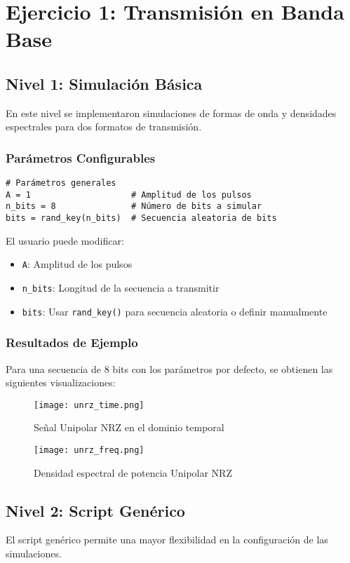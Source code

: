 \documentclass[12pt,a4paper]{article}
\begin{document}
\section{Ejercicio 1: Transmisión en Banda Base}

\subsection{Nivel 1: Simulación Básica}
En este nivel se implementaron simulaciones de formas de onda y densidades espectrales para dos formatos de transmisión.

\subsubsection{Parámetros Configurables}
\begin{lstlisting}[caption=Parámetros del Nivel 1]
# Parámetros generales
A = 1                    # Amplitud de los pulsos
n_bits = 8               # Número de bits a simular
bits = rand_key(n_bits)  # Secuencia aleatoria de bits
\end{lstlisting}

El usuario puede modificar:
\begin{itemize}
    \item \texttt{A}: Amplitud de los pulsos
    \item \texttt{n\_bits}: Longitud de la secuencia a transmitir
    \item \texttt{bits}: Usar \texttt{rand\_key()} para secuencia aleatoria o definir manualmente
\end{itemize}

\subsubsection{Resultados de Ejemplo}
Para una secuencia de 8 bits con los parámetros por defecto, se obtienen las siguientes visualizaciones:

\begin{figure}[H]
    \centering
    \texttt{[image: unrz\_time.png]}
    \caption{Señal Unipolar NRZ en el dominio temporal}
\end{figure}

\begin{figure}[H]
    \centering
    \texttt{[image: unrz\_freq.png]}
    \caption{Densidad espectral de potencia Unipolar NRZ}
\end{figure}

\subsection{Nivel 2: Script Genérico}
El script genérico permite una mayor flexibilidad en la configuración de las simulaciones.
\end{document}
